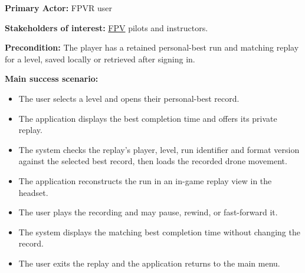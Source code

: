 \documentclass[12pt]{article}
\begin{document}
\begin{description}
\textbf{Primary Actor:} FPVR user

\textbf{Stakeholders of interest:} \hyperlink{glos:FPV}{FPV} pilots and instructors.

\textbf{Precondition:} The player has a retained personal-best run and matching
replay for a level, saved locally or retrieved after signing in.

\textbf{Main success scenario:}
\begin{itemize}
\item The user selects a level and opens their personal-best record.
\item The application displays the best completion time and offers its private replay.
\item The system checks the replay's player, level, run identifier and format version
against the selected best record, then loads the recorded drone movement.
\item The application reconstructs the run in an in-game replay view in the headset.
\item The user plays the recording and may pause, rewind, or fast-forward it.
\item The system displays the matching best completion time without changing the record.
\item The user exits the replay and the application returns to the main menu.
\end{itemize}


\end{description}
\end{document}
